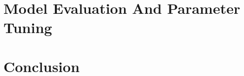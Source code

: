 \documentclass[DIV=14,twocolumn]{scrartcl}
\begin{document}
\section{Model Evaluation And Parameter Tuning}

\section{Conclusion}
{}

\end{document}
